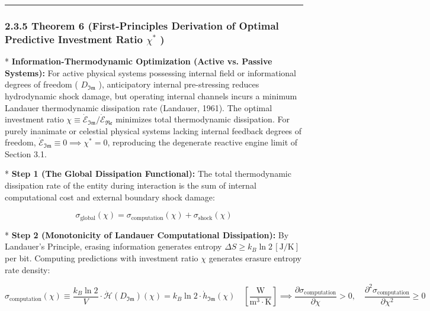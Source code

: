 \documentclass[11pt,a4paper]{article}
\theoremstyle{definition}\newtheorem{definition}{Definition}
\theoremstyle{remark}\newtheorem{remark}{Remark}
\begin{document}
\noindent\rule{\linewidth}{0.4pt}
\subsubsection{2.3.5 Theorem 6 (First-Principles Derivation of Optimal Predictive Investment Ratio $\chi^*$ )}

* \textbf{Information-Thermodynamic Optimization (Active vs. Passive Systems):} For active physical systems possessing internal field or informational degrees of freedom ( $D_{\mathfrak{Im}}$ ), anticipatory internal pre-stressing reduces hydrodynamic shock damage, but operating internal channels incurs a minimum Landauer thermodynamic dissipation rate (Landauer, 1961). The optimal investment ratio $\chi \equiv \dot{\mathcal{E}}_{\mathfrak{Im}} / \dot{\mathcal{E}}_{\mathfrak{Re}}$ minimizes total thermodynamic dissipation. For purely inanimate or celestial physical systems lacking internal feedback degrees of freedom, $\dot{\mathcal{E}}_{\mathfrak{Im}} \equiv 0 \implies \chi^* = 0$, reproducing the degenerate reactive engine limit of Section 3.1.

* \textbf{Step 1 (The Global Dissipation Functional):}
The total thermodynamic dissipation rate of the entity during interaction is the sum of internal computational cost and external boundary shock damage:


\begin{equation}
\sigma_{\text{global}}(\chi) = \sigma_{\text{computation}}(\chi) + \sigma_{\text{shock}}(\chi)
\end{equation}


* \textbf{Step 2 (Monotonicity of Landauer Computational Dissipation):}
By Landauer's Principle, erasing information generates entropy $\Delta S \ge k_B \ln 2 \, [\mathrm{J/K}]$ per bit. Computing predictions with investment ratio $\chi$ generates erasure entropy rate density:


\begin{equation}
\sigma_{\text{computation}}(\chi) \equiv \frac{k_B \ln 2}{V} \cdot \dot{\mathcal{H}}(D_{\mathfrak{Im}})(\chi) = k_B \ln 2 \cdot \dot{h}_{\mathfrak{Im}}(\chi) \quad [\frac{\mathrm{W}}{\mathrm{m^3 \cdot K}}] \implies \frac{\partial \sigma_{\text{computation}}}{\partial \chi} > 0, \quad \frac{\partial^2 \sigma_{\text{computation}}}{\partial \chi^2} \ge 0
\end{equation}
\end{document}
